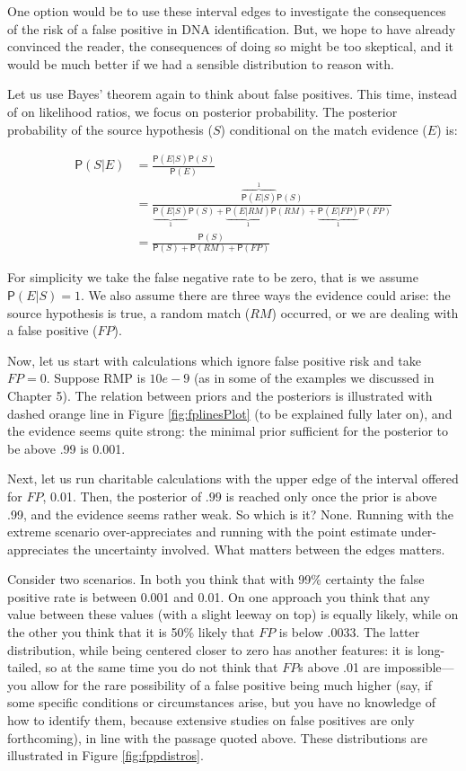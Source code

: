 \documentclass[
  10pt,
  dvipsnames,enabledeprecatedfontcommands]{scrartcl}
\newcommand{\pr}[1]{\mathsf{P}(#1)}
\begin{document}
One option would be to use these interval edges to investigate the
consequences of the risk of a false positive in DNA identification. But,
we hope to have already convinced the reader, the consequences of doing
so might be too skeptical, and it would be much better if we had a
sensible distribution to reason with.

Let us use Bayes' theorem again to think about false positives. This
time, instead of on likelihood ratios, we focus on posterior
probability. The posterior probability of the source hypothesis (\(S\))
conditional on the match evidence (\(E\)) is:

\begin{align*}
\pr{S \vert E} &   =  \frac{\pr{E\vert S} \pr{S} } {\pr{E}}\\
& = \frac{\overbrace{\pr{E\vert S}}^1 \pr{S}}{\underbrace{\pr{E\vert S}}_1 \pr{S} + \underbrace{\pr{E \vert RM}}_1 \pr{RM} + \underbrace{\pr{E \vert FP}}_1 \pr{FP}} \\ & = \frac{\pr{S}}{\pr{S} + \pr{RM} + \pr{FP}} 
\end{align*}

For simplicity we take the false negative rate to be zero, that is we
assume \(\pr{E\vert S} =1\). We also assume there are three ways the
evidence could arise: the source hypothesis is true, a random match
(\(RM\)) occurred, or we are dealing with a false positive (\(FP\)).

Now, let us start with calculations which ignore false positive risk and
take \(FP=0\). Suppose RMP is \(10e-9\) (as in some of the examples we
discussed in Chapter 5). The relation between priors and the posteriors
is illustrated with dashed orange line in Figure \ref{fig:fplinesPlot}
(to be explained fully later on), and the evidence seems quite strong:
the minimal prior sufficient for the posterior to be above .99 is 0.001.

Next, let us run charitable calculations with the upper edge of the
interval offered for \(FP\), 0.01. Then, the posterior of \(.99\) is
reached only once the prior is above .99, and the evidence seems rather
weak. So which is it? None. Running with the extreme scenario
over-appreciates and running with the point estimate under-appreciates
the uncertainty involved. What matters between the edges matters.

Consider two scenarios. In both you think that with 99\% certainty the
false positive rate is between 0.001 and 0.01. On one approach you think
that any value between these values (with a slight leeway on top) is
equally likely, while on the other you think that it is 50\% likely that
\(FP\) is below .0033. The latter distribution, while being centered
closer to zero has another features: it is long-tailed, so at the same
time you do not think that \(FP\)s above .01 are impossible---you allow
for the rare possibility of a false positive being much higher (say, if
some specific conditions or circumstances arise, but you have no
knowledge of how to identify them, because extensive studies on false
positives are only forthcoming), in line with the passage quoted above.
These distributions are illustrated in Figure \ref{fig:fppdistros}.
\end{document}
